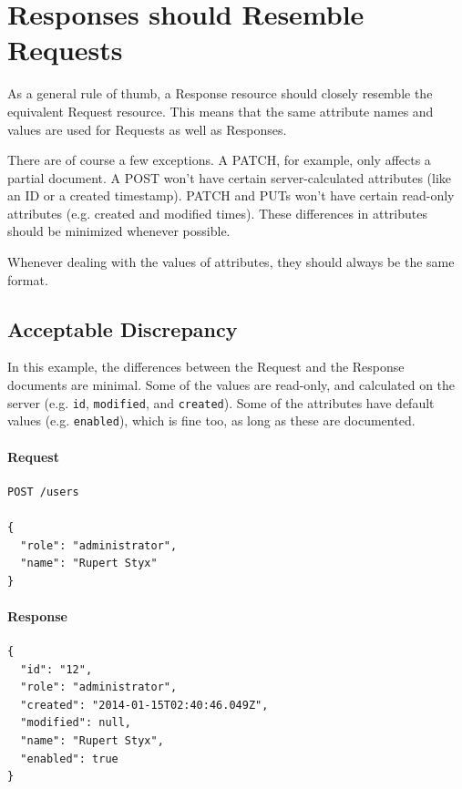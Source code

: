 \documentclass{book}
\begin{document}
\section{Responses should Resemble Requests}

As a general rule of thumb, a Response resource should closely resemble the equivalent Request resource. This means that the same attribute names and values are used for Requests as well as Responses.

There are of course a few exceptions. A PATCH, for example, only affects a partial document. A POST won't have certain server-calculated attributes (like an ID or a created timestamp). PATCH and PUTs won't have certain read-only attributes (e.g. created and modified times). These differences in attributes should be minimized whenever possible.

Whenever dealing with the values of attributes, they should always be the same format.

\subsection{Acceptable Discrepancy}

In this example, the differences between the Request and the Response documents are minimal. Some of the values are read-only, and calculated on the server (e.g. \texttt{id}, \texttt{modified}, and \texttt{created}). Some of the attributes have default values (e.g. \texttt{enabled}), which is fine too, as long as these are documented.

\paragraph{\textbf{Request}}

\begin{verbatim}
POST /users

{
  "role": "administrator",
  "name": "Rupert Styx"
}
\end{verbatim}

\paragraph{\textbf{Response}}

\begin{verbatim}
{
  "id": "12",
  "role": "administrator",
  "created": "2014-01-15T02:40:46.049Z",
  "modified": null,
  "name": "Rupert Styx",
  "enabled": true
}
\end{verbatim}
\end{document}

